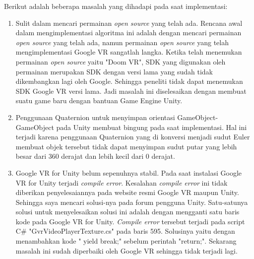 Berikut adalah beberapa masalah yang dihadapi pada saat implementasi:
\begin{enumerate}
    \item Sulit dalam mencari permainan \textit{open source} yang telah ada. Rencana awal dalam mengimplementasi algoritma ini adalah dengan mencari permainan \textit{open source} yang telah ada, namun permainan \textit{open source} yang telah mengimplementasi Google VR sangatlah langka. Ketika telah menemukan permainan \textit{open source} yaitu "Doom VR", SDK yang digunakan oleh permainan merupakan SDK dengan versi lama yang sudah tidak dikembangkan lagi oleh Google. Sehingga peneliti tidak dapat menemukan SDK Google VR versi lama. Jadi masalah ini diselesaikan dengan membuat suatu game baru dengan bantuan Game Engine Unity.
    \item Penggunaan Quaternion untuk menyimpan orientasi GameObject-GameObject pada Unity membuat bingung pada saat implementasi. Hal ini terjadi karena penggunaan Quaternion yang di konversi menjadi sudut Euler membuat objek tersebut tidak dapat menyimpan sudut putar yang lebih besar dari 360 derajat dan lebih kecil dari 0 derajat.
    \item Google VR for Unity belum sepenuhnya stabil. Pada saat instalasi Google VR for Unity terjadi \textit{compile error}. Kesalahan \textit{compile error} ini tidak diberikan penyelesaiannya pada website resmi Google VR maupun Unity. Sehingga saya mencari solusi-nya pada forum pengguna Unity. Satu-satunya solusi untuk menyelesaikan solusi ini adalah dengan mengganti satu baris kode pada Google VR for Unity. \textit{Compile error} tersebut terjadi pada script C\# "GvrVideoPlayerTexture.cs" pada baris 595. Solusinya yaitu dengan menambahkan kode "   yield break;" sebelum perintah "return;". Sekarang masalah ini sudah diperbaiki oleh Google VR sehingga tidak terjadi lagi.
\end{enumerate}